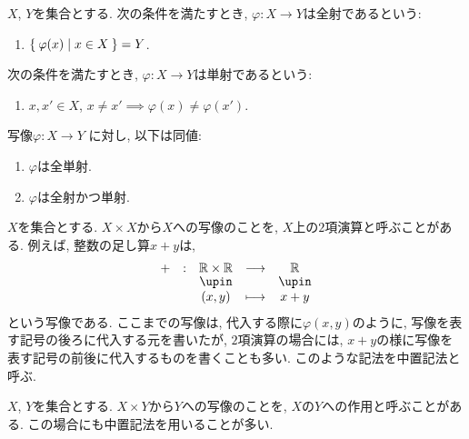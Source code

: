 \begin{definition}
$X$, $Y$を集合とする.
次の条件を満たすとき,
$\varphi\colon X\to Y$は全射であるという:
\begin{enumerate}
\item $\Set{\varphi(x)|x\in X}=Y$.
\end{enumerate}
次の条件を満たすとき,
$\varphi\colon X\to Y$は単射であるという:
\begin{enumerate}
\item $x,x'\in X$,  $x\neq x'\implies \varphi(x)\neq \varphi(x')$.
\end{enumerate}
\end{definition}
\begin{prop}
写像$\varphi\colon X\to Y$
に対し, 以下は同値:
\begin{enumerate}
\item $\varphi$は全単射.
\item $\varphi$は全射かつ単射.
\end{enumerate}
\end{prop}

$X$を集合とする.
$X\times X$から$X$への写像のことを,
$X$上の$2$項演算と呼ぶことがある.
例えば, 整数の足し算$x+y$は,
\begin{align*}
\shazo{+}{\RR\times \RR}{\RR}
{(x,y)}{x+y}
\end{align*}
という写像である.
ここまでの写像は, 代入する際に$\varphi(x,y)$のように,
写像を表す記号の後ろに代入する元を書いたが,
$2$項演算の場合には, $x+y$の様に写像を表す記号の前後に代入するものを書くことも多い.
このような記法を中置記法と呼ぶ.

$X$, $Y$を集合とする.
$X\times Y$から$Y$への写像のことを,
$X$の$Y$への作用と呼ぶことがある.
この場合にも中置記法を用いることが多い.


